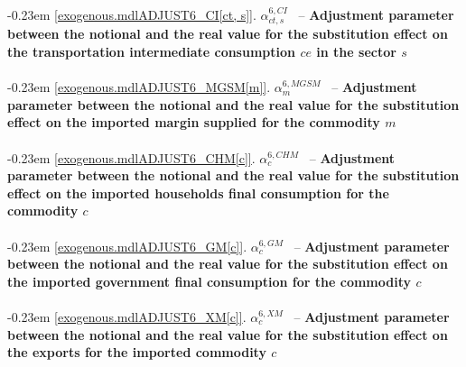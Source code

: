 \documentclass[12pt]{article}
\numberwithin{equation}{section}
\begin{document}
\noindent \kern-0.23em \noindent \begingroup {} \label{exogenous.mdlADJUST6_CI[ct, s]}\ref{exogenous.mdlADJUST6_CI[ct, s]}.
         
        \ensuremath{\alpha^{{6},CI}_{ct, s}}~ \endgroup -- \noindent \textbf{Adjustment parameter between the notional and the real value for the substitution effect on the transportation intermediate consumption $ce$ in the sector $s$}  \\ \\[-8pt]


\noindent \kern-0.23em \noindent \begingroup {} \label{exogenous.mdlADJUST6_MGSM[m]}\ref{exogenous.mdlADJUST6_MGSM[m]}.
         
        \ensuremath{\alpha^{{6},MGSM}_{m}}~ \endgroup -- \noindent \textbf{Adjustment parameter between the notional and the real value for the substitution effect on the imported margin supplied for the commodity $m$}  \\ \\[-8pt]


\noindent \kern-0.23em \noindent \begingroup {} \label{exogenous.mdlADJUST6_CHM[c]}\ref{exogenous.mdlADJUST6_CHM[c]}.
         
        \ensuremath{\alpha^{{6},CHM}_{c}}~ \endgroup -- \noindent \textbf{Adjustment parameter between the notional and the real value for the substitution effect on the imported households final consumption for the commodity $c$}  \\ \\[-8pt]


\noindent \kern-0.23em \noindent \begingroup {} \label{exogenous.mdlADJUST6_GM[c]}\ref{exogenous.mdlADJUST6_GM[c]}.
         
        \ensuremath{\alpha^{{6},GM}_{c}}~ \endgroup -- \noindent \textbf{Adjustment parameter between the notional and the real value for the substitution effect on the  imported government final consumption for the commodity $c$}  \\ \\[-8pt]


\noindent \kern-0.23em \noindent \begingroup {} \label{exogenous.mdlADJUST6_XM[c]}\ref{exogenous.mdlADJUST6_XM[c]}.
         
        \ensuremath{\alpha^{{6},XM}_{c}}~ \endgroup -- \noindent \textbf{Adjustment parameter between the notional and the real value for the substitution effect on the exports for the imported commodity $c$}  \\ \\[-8pt]
\end{document}
